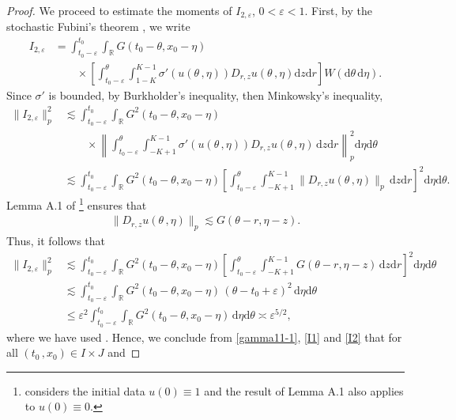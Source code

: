 \documentclass[12pt,a4paper]{article}
\newcommand{\R}{{\mathbb{R}}}
\renewcommand{\d}{\mathrm{d}}
\newcommand {\ep}{{\varepsilon}}
\newcommand{\<}{\langle}
\renewcommand{\>}{\rangle}
\begin{document}
\begin{proof}
We proceed to estimate the moments of $I_{2, \varepsilon}$, $0 < \varepsilon < 1$. First, by the stochastic Fubini's theorem \cite[Theorem 2.4.1]{dss}, we write
\begin{align*}
      I_{2, \varepsilon} &= \int_{t_0-\varepsilon}^{t_0}\int_\R G(t_0-\theta, x_0-\eta) \\
        &\qquad \times \left[\int_{t_0-\varepsilon}^{\theta}\int_{1-K}^{K-1}  \sigma'(u(\theta\,, \eta))D_{r,z}u(\theta\,,\eta)\d z \d r 
         \right] W(\d \theta\, \d \eta).
\end{align*}
Since $\sigma'$ is bounded, by Burkholder's inequality, then Minkowsky's inequality,
\begin{align*}
         \|I_{2, \varepsilon}\|_p^2& \lesssim 
         \int_{t_0-\varepsilon}^{t_0}\int_\R G^2(t_0-\theta, x_0-\eta) \\
       &\qquad \times \left\|\int_{t_0-\varepsilon}^{\theta}\int_{-K+1}^{K-1}
         \sigma'(u(\theta\,, \eta))D_{r,z}u(\theta\,,\eta) \, \d z \d r  \right\|_p^2\d \eta\d \theta\\
         &\lesssim  \int_{t_0-\varepsilon}^{t_0}\int_\R G^2(t_0-\theta, x_0-\eta) 
          \left[\int_{t_0-\varepsilon}^{\theta}\int_{-K+1}^{K-1}
         \|D_{r,z}u(\theta\,,\eta)\|_p \, \d z \d r  \right]^2\d \eta\d \theta.
 \end{align*}
Lemma A.1 of \cite{HNV20}\footnote{\cite{HNV20} considers the initial data $u(0)\equiv1$ and the result of Lemma A.1 also applies to $u(0)\equiv0$.} ensures that
\begin{align*}
         \|D_{r,z}u(\theta\,,\eta)\|_p \lesssim G(\theta-r, \eta-z).
\end{align*}
Thus, it follows that
\begin{align}
                  \|I_{2, \varepsilon}\|_p^2& \lesssim
                    \int_{t_0-\varepsilon}^{t_0}\int_\R G^2(t_0-\theta, x_0-\eta) 
         \left[\int_{t_0-\varepsilon}^{\theta}\int_{-K+1}^{K-1}
         G(\theta-r, \eta-z)\, \d z \d r \right]^2\d \eta\d \theta\nonumber\\
         &\lesssim             \int_{t_0-\varepsilon}^{t_0}\int_\R G^2(t_0-\theta, x_0-\eta)\,
        (\theta - t_0 + \ep)^2 \, \d \eta\d \theta\nonumber\\
         &\leq \varepsilon^2               \int_{t_0-\varepsilon}^{t_0}\int_\R G^2(t_0-\theta, x_0-\eta) \,
         \d \eta\d \theta 
          \asymp \varepsilon^{5/2},
  \label{I2}
\end{align}
where we have used \cite[(A.5)]{bp1998}. 
         Hence, we conclude from \eqref{gamma11-1}, \eqref{I1} and \eqref{I2} that for all $(t_0\,,x_0)\in I\times J$ and 

\end{proof}
\end{document}
